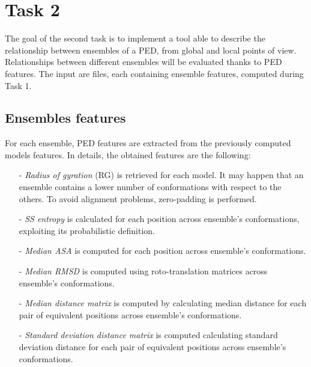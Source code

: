\section{Task 2}\label{sec:task2}

The goal of the second task is to implement a tool able to describe the relationship between ensembles of a PED, from global and local points of view. Relationships between different ensembles will be evaluated thanks to PED features. The input are files, each containing ensemble features, computed during Task 1.

\subsection{Ensembles features}
For each ensemble, PED features are extracted from the previously computed models features. In details, the obtained features are the following:

\begin{itemize}
\item[-] \emph{Radius of gyration} (RG) is retrieved for each model. It may happen that an ensemble contains a lower number of conformations with respect to the others. To avoid alignment problems, zero-padding is performed.
\item[-] \emph{SS entropy} is calculated for each position across ensemble's conformations, exploiting its probabilistic definition.
\item[-] \emph{Median ASA} is computed for each position across ensemble's conformations.
\item[-] \emph{Median RMSD} is computed using roto-translation matrices across ensemble's conformations.
\item[-] \emph{Median distance matrix} is computed by calculating median distance for each pair of equivalent positions across ensemble's conformations.
\item[-] \emph{Standard deviation distance matrix} is computed calculating standard deviation distance for each pair of equivalent positions across ensemble's conformations.
\end{itemize}

